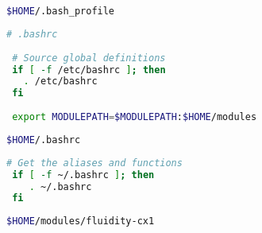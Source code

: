 \begin{lstlisting}[language=bash]
$HOME/.bash_profile
\end{lstlisting}

\begin{lstlisting}[language=bash]
 # .bashrc
 
 # Source global definitions
 if [ -f /etc/bashrc ]; then
   . /etc/bashrc
 fi
 
 export MODULEPATH=$MODULEPATH:$HOME/modules
\end{lstlisting}

\begin{lstlisting}[language=bash]
$HOME/.bashrc
\end{lstlisting}

\begin{lstlisting}[language=bash]
 # Get the aliases and functions
 if [ -f ~/.bashrc ]; then
 	. ~/.bashrc
 fi
\end{lstlisting}


\begin{lstlisting}[language=bash]
$HOME/modules/fluidity-cx1
\end{lstlisting}